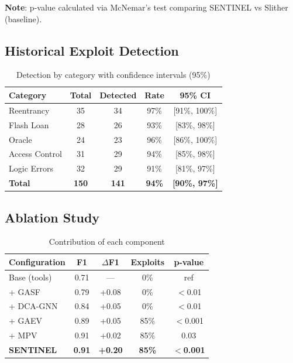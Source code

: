 \documentclass[11pt]{article}
\theoremstyle{definition}
\theoremstyle{plain}
\theoremstyle{remark}
\begin{document}
\textbf{Note}: p-value calculated via McNemar's test comparing SENTINEL vs Slither (baseline).

\subsection{Historical Exploit Detection}

\begin{table}[H]
\centering
\caption{Detection by category with confidence intervals (95\%)}
\label{tab:historical}
\begin{tabular}{lcccc}
\toprule
\textbf{Category} & \textbf{Total} & \textbf{Detected} & \textbf{Rate} & \textbf{95\% CI} \\
\midrule
Reentrancy & 35 & 34 & 97\% & [91\%, 100\%] \\
Flash Loan & 28 & 26 & 93\% & [83\%, 98\%] \\
Oracle & 24 & 23 & 96\% & [86\%, 100\%] \\
Access Control & 31 & 29 & 94\% & [85\%, 98\%] \\
Logic Errors & 32 & 29 & 91\% & [81\%, 97\%] \\
\midrule
\textbf{Total} & \textbf{150} & \textbf{141} & \textbf{94\%} & \textbf{[90\%, 97\%]} \\
\bottomrule
\end{tabular}
\end{table}

\subsection{Ablation Study}

\begin{table}[H]
\centering
\caption{Contribution of each component}
\label{tab:ablation}
\begin{tabular}{lcccc}
\toprule
\textbf{Configuration} & \textbf{F1} & \textbf{$\Delta$F1} & \textbf{Exploits} & \textbf{p-value} \\
\midrule
Base (tools) & 0.71 & --- & 0\% & ref \\
+ GASF & 0.79 & +0.08 & 0\% & $<$0.01 \\
+ DCA-GNN & 0.84 & +0.05 & 0\% & $<$0.01 \\
+ GAEV & 0.89 & +0.05 & 85\% & $<$0.001 \\
+ MPV & 0.91 & +0.02 & 85\% & 0.03 \\
\midrule
\textbf{SENTINEL} & \textbf{0.91} & \textbf{+0.20} & \textbf{85\%} & $<$\textbf{0.001} \\
\bottomrule
\end{tabular}
\end{table}
\end{document}
